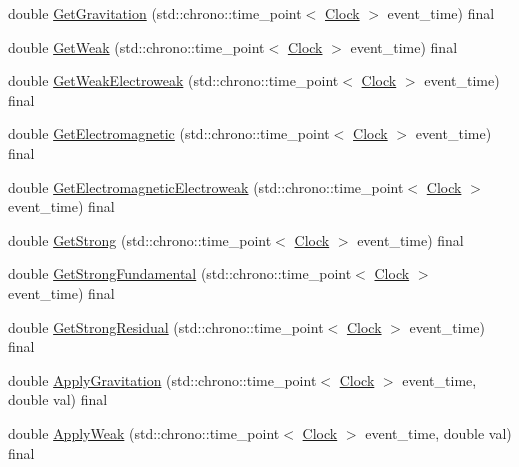 \begin{DoxyCompactItemize}
\item 
double \hyperlink{class_law_a84bdc0c2ca97a9c19422018ff761b992}{Get\+Gravitation} (std\+::chrono\+::time\+\_\+point$<$ \hyperlink{universe_8h_a0ef8d951d1ca5ab3cfaf7ab4c7a6fd80}{Clock} $>$ event\+\_\+time) final
\item 
double \hyperlink{class_law_a303c365b7a17997a63a74756fc72fba3}{Get\+Weak} (std\+::chrono\+::time\+\_\+point$<$ \hyperlink{universe_8h_a0ef8d951d1ca5ab3cfaf7ab4c7a6fd80}{Clock} $>$ event\+\_\+time) final
\item 
double \hyperlink{class_law_aad6e54da64a5d8499dcb6c232aa6748f}{Get\+Weak\+Electroweak} (std\+::chrono\+::time\+\_\+point$<$ \hyperlink{universe_8h_a0ef8d951d1ca5ab3cfaf7ab4c7a6fd80}{Clock} $>$ event\+\_\+time) final
\item 
double \hyperlink{class_law_a01eba6e68d2d8a717e2b4789be90853d}{Get\+Electromagnetic} (std\+::chrono\+::time\+\_\+point$<$ \hyperlink{universe_8h_a0ef8d951d1ca5ab3cfaf7ab4c7a6fd80}{Clock} $>$ event\+\_\+time) final
\item 
double \hyperlink{class_law_ae4ccaca7b78905f416f35f9556b1923c}{Get\+Electromagnetic\+Electroweak} (std\+::chrono\+::time\+\_\+point$<$ \hyperlink{universe_8h_a0ef8d951d1ca5ab3cfaf7ab4c7a6fd80}{Clock} $>$ event\+\_\+time) final
\item 
double \hyperlink{class_law_afd94bf09dbaf5d5df36b8f093db02dd9}{Get\+Strong} (std\+::chrono\+::time\+\_\+point$<$ \hyperlink{universe_8h_a0ef8d951d1ca5ab3cfaf7ab4c7a6fd80}{Clock} $>$ event\+\_\+time) final
\item 
double \hyperlink{class_law_afcdbea76524e5a52691fff7b526971e9}{Get\+Strong\+Fundamental} (std\+::chrono\+::time\+\_\+point$<$ \hyperlink{universe_8h_a0ef8d951d1ca5ab3cfaf7ab4c7a6fd80}{Clock} $>$ event\+\_\+time) final
\item 
double \hyperlink{class_law_a70fb2a7710776c4e2315a1e29fe35eb6}{Get\+Strong\+Residual} (std\+::chrono\+::time\+\_\+point$<$ \hyperlink{universe_8h_a0ef8d951d1ca5ab3cfaf7ab4c7a6fd80}{Clock} $>$ event\+\_\+time) final
\item 
double \hyperlink{class_law_a04efdc724335219ab0affdcffb55eea2}{Apply\+Gravitation} (std\+::chrono\+::time\+\_\+point$<$ \hyperlink{universe_8h_a0ef8d951d1ca5ab3cfaf7ab4c7a6fd80}{Clock} $>$ event\+\_\+time, double val) final
\item 
double \hyperlink{class_law_a96ddd42403e3665c6070283ac201658d}{Apply\+Weak} (std\+::chrono\+::time\+\_\+point$<$ \hyperlink{universe_8h_a0ef8d951d1ca5ab3cfaf7ab4c7a6fd80}{Clock} $>$ event\+\_\+time, double val) final

\end{DoxyCompactItemize}
